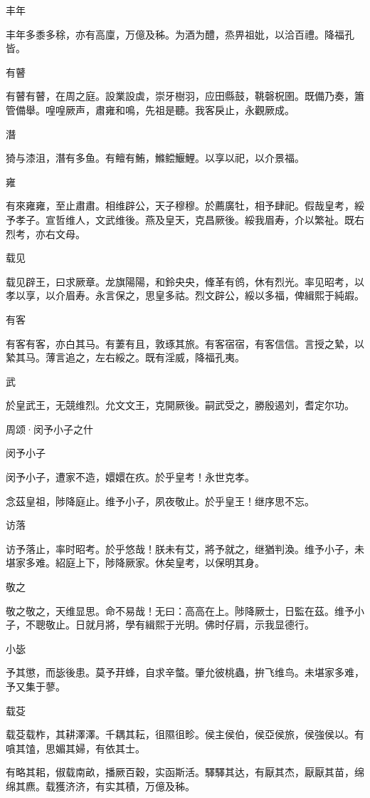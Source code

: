 丰年

丰年多黍多稌，亦有高廩，万億及秭。为酒为醴，烝畀祖妣，以洽百禮。降福孔皆。

有瞽

有瞽有瞽，在周之庭。設業設虡，崇牙樹羽，应田縣鼓，鞉磬柷圉。既備乃奏，簫管備舉。喤喤厥声，肅雍和鳴，先祖是聽。我客戾止，永觀厥成。

潛

猗与漆沮，潛有多鱼。有鳣有鮪，鰷鲿鰋鯉。以享以祀，以介景福。

雍

有來雍雍，至止肅肅。相维辟公，天子穆穆。於薦廣牡，相予肆祀。假哉皇考，綏予孝子。宣哲维人，文武维後。燕及皇天，克昌厥後。綏我眉寿，介以繁祉。既右烈考，亦右文母。

载见

载见辟王，曰求厥章。龙旗陽陽，和鈴央央，鞗革有鸧，休有烈光。率见昭考，以孝以享，以介眉寿。永言保之，思皇多祜。烈文辟公，綏以多福，俾緝熙于純嘏。

有客

有客有客，亦白其马。有萋有且，敦琢其旅。有客宿宿，有客信信。言授之縶，以縶其马。薄言追之，左右綏之。既有淫威，降福孔夷。

武

於皇武王，无競维烈。允文文王，克開厥後。嗣武受之，勝殷遏刘，耆定尔功。




周颂·闵予小子之什


闵予小子

闵予小子，遭家不造，嬛嬛在疚。於乎皇考！永世克孝。

念茲皇祖，陟降庭止。维予小子，夙夜敬止。於乎皇王！继序思不忘。

访落

访予落止，率时昭考。於乎悠哉！朕未有艾，將予就之，继猶判渙。维予小子，未堪家多难。紹庭上下，陟降厥家。休矣皇考，以保明其身。

敬之

敬之敬之，天维显思。命不易哉！无曰：高高在上。陟降厥士，日監在茲。维予小子，不聰敬止。日就月將，學有緝熙于光明。佛时仔肩，示我显德行。

小毖

予其懲，而毖後患。莫予荓蜂，自求辛螫。肇允彼桃蟲，拚飞维鸟。未堪家多难，予又集于蓼。

载芟

载芟载柞，其耕澤澤。千耦其耘，徂隰徂畛。侯主侯伯，侯亞侯旅，侯強侯以。有嗿其馌，思媚其婦，有依其士。

有略其耜，俶载南畝，播厥百穀，实函斯活。驛驛其达，有厭其杰，厭厭其苗，绵绵其麃。载獲济济，有实其積，万億及秭。

